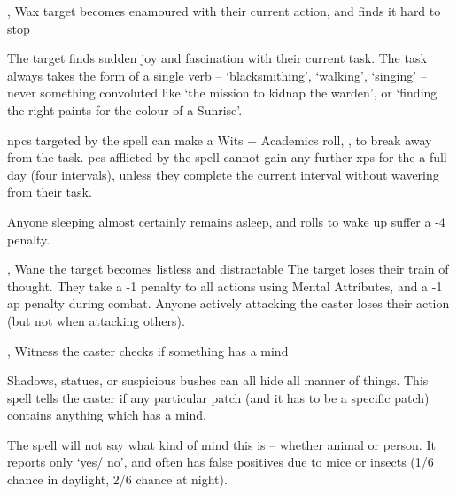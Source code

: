   {\mFate, \mWater}%
  {Wax}%
  {}%
  {}%
  {target becomes enamoured with their current action, and finds it hard to stop}%
  {
    The target finds sudden joy and fascination with their current task.
    The task always takes the form of a single verb -- `blacksmithing', `walking', `singing' -- never something convoluted like `the mission to kidnap the warden', or `finding the right paints for the colour of a Sunrise'.

    \Glspl{npc} targeted by the spell can make a Wits + Academics roll, , to break away from the task.
    \Glspl{pc} afflicted by the spell cannot gain any further \glspl{xp} for the a full day (four \glspl{interval}), unless they complete the current \gls{interval} without wavering from their task.

  Anyone sleeping almost certainly remains asleep, and rolls to wake up suffer a -4 penalty.
  }

  {\mFate, \mWater}%
  {Wane}%
  {}%
  {}%
  {the target becomes listless and distractable}%
  {
    The target loses their train of thought.
    They take a -1 penalty to all actions using Mental Attributes, and a -1 \gls{ap} penalty during combat.
    Anyone actively attacking the caster loses their action (but not when attacking others).
  }

  {\mFate, \mWater}%
  {Witness}%
  {}%
  {}%
  {the caster checks if something has a mind}%
  {
    Shadows, statues, or suspicious bushes can all hide all manner of things.
    This spell tells the caster if any particular patch (and it has to be a specific patch) contains anything which has a mind.

    The spell will not say what kind of mind this is -- whether animal or person.
    It reports only `yes/ no', and often has false positives due to mice or insects (1/6 chance in daylight, 2/6 chance at night).
  }

